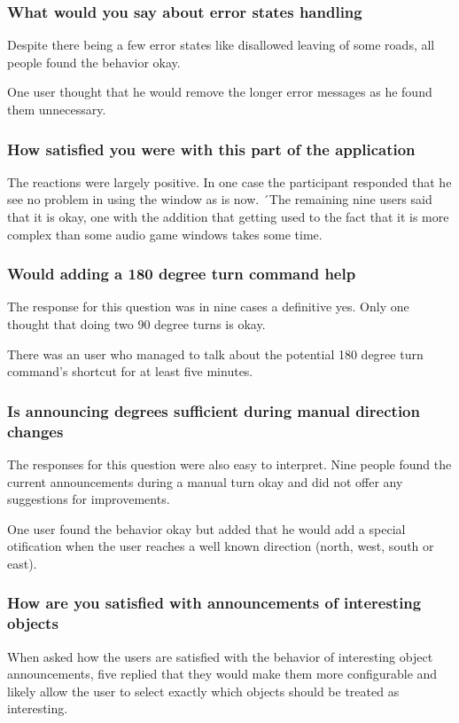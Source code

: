 \documentclass[nolof,digital]{fithesis3}
\begin{document}
\subsubsection{What would you say about error states handling}
Despite there being a few error states like disallowed leaving of some roads, all people found the behavior okay.

One user thought that he would remove the longer error messages as he found them unnecessary.
\subsubsection{How satisfied you were with this part of the application}
The reactions were largely positive. In one case the participant responded that he see no problem in using the window as is now. ´The remaining nine users said that it is okay, one with the addition that getting used to the fact that it is more complex than some audio game windows takes some time.
\subsubsection{Would adding a 180 degree turn command help}
The response for this question was in nine cases a definitive yes. Only one thought that doing two 90 degree turns is okay.

There was an user who managed to talk about the potential 180 degree turn command's shortcut for at least five minutes.
\subsubsection{Is announcing degrees sufficient during manual direction changes}
The responses for this question were also easy to interpret. Nine people found the current announcements during a manual turn okay and did not offer any suggestions for improvements.

One user found the behavior okay but added that he would add a special otification when the user reaches a well known direction (north, west, south or east).
\subsubsection{How are you satisfied with announcements of interesting objects}
When asked how the users are satisfied with the behavior of interesting object announcements, five replied that they would make them more configurable and likely allow the user to select exactly which objects should be treated as interesting.
\end{document}
